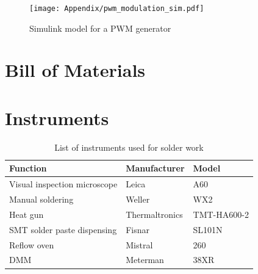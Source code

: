 \begin{figure}[H]
	\centering
	\texttt{[image: Appendix/pwm\_modulation\_sim.pdf]}
	\caption{Simulink model for a PWM generator}
	\label{fig:pwm_modulator_sim}
\end{figure}















\chapter{Bill of Materials}


\chapter{Instruments}
\begin{table}[H]
	\centering
	\begin{tabular}{@{}lll@{}}
		\toprule
		\textbf{Function} & \textbf{Manufacturer} & \textbf{Model} \\ \midrule
		Visual inspection microscope & Leica & A60 \\
		Manual soldering & Weller & WX2 \\
		Heat gun & Thermaltronics & TMT-HA600-2 \\
		SMT solder paste dispensing & Fisnar & SL101N \\
		Reflow oven & Mistral & 260 \\
		DMM & Meterman & 38XR \\ \bottomrule
	\end{tabular}
	\caption{List of instruments used for solder work}
	\label{tab:instruments_solder_work}
\end{table}

